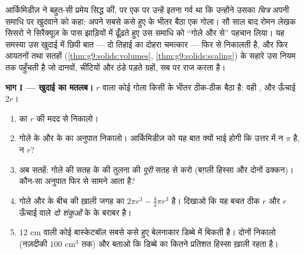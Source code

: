 \begin{problem}
\label{pb:g9:solids:1}
आर्किमिडीज़ ने बहुत-सी प्रमेय सिद्ध कीं, पर एक पर उन्हें इतना गर्व
था कि उन्होंने उसका \emph{चित्र} अपनी समाधि पर खुदवाने को कहा: अपने
सबसे कसे हुए  के भीतर बैठा एक गोला। सौ साल बाद रोमन लेखक सिसरो
ने सिरैक्यूज़ के पास झाड़ियों में ढूँढ़ते हुए उस समाधि को ``गोले और
 से'' पहचान लिया। यह समस्या उस खुदाई में छिपी बात --- दो तिहाई
का दोहरा चमत्कार --- फिर से निकालती है, और फिर आयतनों तथा सतहों
(\cref{thm:g9:solids:volumes}, \cref{thm:g9:solids:scaling}) के
सहारे उस नियम तक पहुँचती है जो दानवों, चींटियों और ठंडे पड़ते
ग्रहों, सब पर राज करता है।

\medskip
\noindent\textbf{भाग I --- खुदाई का मतलब।}
$r$  वाला कोई गोला किसी  के भीतर ठीक-ठीक बैठा है: वही
, और ऊँचाई $2r$।
\begin{enumerate}
  \item {} का  $r$ की मदद से निकालो।
  \item गोले के  और  के  का अनुपात निकालो। आर्किमिडीज़
        को यह बात क्यों भाई होगी कि उत्तर में न $\pi$ है, न $r$?
  \item अब सतहें: गोले की सतह के  की तुलना  की
        \emph{पूरी} सतह से करो (बग़ली हिस्सा और दोनों ढक्कन)। कौन-सा
        अनुपात फिर से सामने आता है?
  \item गोले और  के बीच की ख़ाली जगह का 
        $2\pi r^3 - \frac43\pi r^3$ है। दिखाओ कि यह बचत ठीक $r$
         और $r$ ऊँचाई वाले \emph{दो शंकुओं} के  के
        बराबर है।
  \item $12$ cm  वाली कोई बास्केटबॉल सबसे कसे हुए बेलनाकार
        डिब्बे में बिकती है। दोनों  निकालो (नज़दीकी
        $100$ cm$^3$ तक) और बताओ कि डिब्बे का कितने प्रतिशत हिस्सा
        ख़ाली रहता है।
\end{enumerate}


\end{problem}
